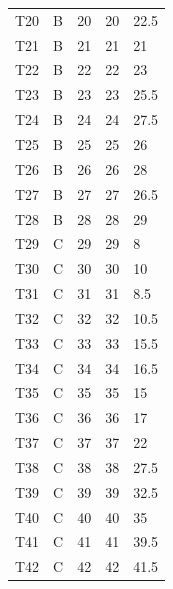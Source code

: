 \documentclass[	DIV=calc,%
paper=a4,%
fontsize=12pt,%
onecolumn]{scrartcl}	 					%
\begin{document}
\begin{table}[h]
\begin{tabular}{lllll}
		T20                  & B     & 20                & 20       & 22.5     \\
		T21                  & B     & 21                & 21       & 21       \\
		T22                  & B     & 22                & 22       & 23       \\
		T23                  & B     & 23                & 23       & 25.5     \\
		T24                  & B     & 24                & 24       & 27.5     \\
		T25                  & B     & 25                & 25       & 26       \\
		T26                  & B     & 26                & 26       & 28       \\
		T27                  & B     & 27                & 27       & 26.5     \\
		T28                  & B     & 28                & 28       & 29       \\
		T29                  & C     & 29                & 29       & 8        \\
		T30                  & C     & 30                & 30       & 10       \\
		T31                  & C     & 31                & 31       & 8.5      \\
		T32                  & C     & 32                & 32       & 10.5     \\
		T33                  & C     & 33                & 33       & 15.5     \\
		T34                  & C     & 34                & 34       & 16.5     \\
		T35                  & C     & 35                & 35       & 15       \\
		T36                  & C     & 36                & 36       & 17       \\
		T37                  & C     & 37                & 37       & 22       \\
		T38                  & C     & 38                & 38       & 27.5     \\
		T39                  & C     & 39                & 39       & 32.5     \\
		T40                  & C     & 40                & 40       & 35       \\
		T41                  & C     & 41                & 41       & 39.5     \\
		T42                  & C     & 42                & 42       & 41.5     \\
		\bottomrule
		\end{tabular}
	\end{table}
\clearpage	
	
\end{document}
